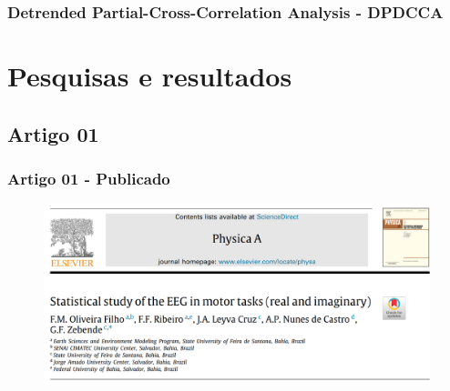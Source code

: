 \documentclass[11pt, aspectratio=169]{beamer}
\begin{document}
\begin{frame}
  \frametitle{Detrended Partial-Cross-Correlation Analysis - DPDCCA}
  
  
\end{frame}
\section{Pesquisas e resultados}

\subsection{Artigo 01}

\begin{frame}
  \frametitle{Artigo 01 - Publicado}
  \begin{figure}[!htb]    \centering
    \caption{\cite{Oliveira2023}}
    \includegraphics[height=.6\paperheight]{../Figures/artigos_publicados/artigo_01_abr_2023.png}
    \label{fig:ar_pub_01}
  \end{figure}
\end{frame}
\end{document}
